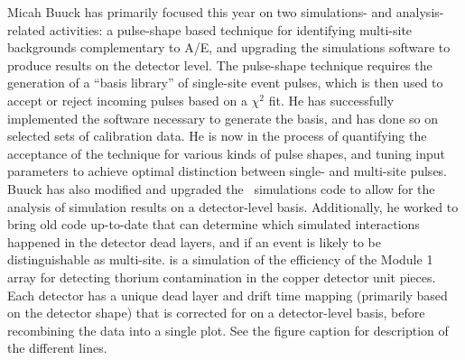 Micah Buuck has primarily focused this year on two simulations- and analysis-related activities: a pulse-shape based technique for identifying multi-site backgrounds complementary to A/E, and upgrading the simulations software to produce results on the detector level.\newline
\indent The pulse-shape technique requires the generation of a ``basis library'' of single-site event pulses, which is then used to accept or reject incoming pulses based on a $\chi^2$ fit. He has successfully implemented the software necessary to generate the basis, and has done so on selected sets of calibration data. He is now in the process of quantifying the acceptance of the technique for various kinds of pulse shapes, and tuning input parameters to achieve optimal distinction between single- and multi-site pulses.\newline
\indent Buuck has also modified and upgraded the \MJ\ simulations code to allow for the analysis of simulation results on a detector-level basis. Additionally, he worked to bring old code up-to-date that can determine which simulated interactions happened in the detector dead layers, and if an event is likely to be distinguishable as multi-site.  is a simulation of the efficiency of the Module 1 array for detecting thorium contamination in the copper detector unit pieces. Each detector has a unique dead layer and drift time mapping (primarily based on the detector shape) that is corrected for on a detector-level basis, before recombining the data into a single plot. See the figure caption for description of the different lines.

